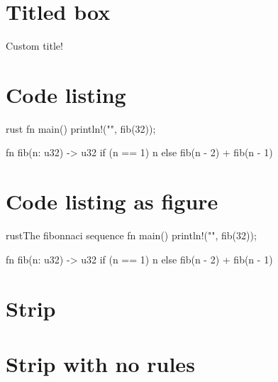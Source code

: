 \documentclass{scipaper}
\begin{document}
	\section{Titled box}
	\begin{titledbox}{Custom title!}
		\lipsum[1]
	\end{titledbox}
	\section{Code listing}
	\begin{codelisting}{rust}
		fn main() {
			println!("{}", fib(32));
		}
	
		fn fib(n: u32) -> u32 {
			if (n == 1) {
				n
			} else {
				fib(n - 2) + fib(n - 1)
			} 
		}
	\end{codelisting}
	\section{Code listing as figure}
	\begin{code}{rust}{The fibonnaci sequence}
		fn main() {
			println!("{}", fib(32));
		}
		
		fn fib(n: u32) -> u32 {
			if (n == 1) {
				n
			} else {
				fib(n - 2) + fib(n - 1)
			} 
		} 
	\end{code}
	\section{Strip}
	\lipsum[1-3]
	\begin{strip}
		\lipsum[3-6]
	\end{strip}
	\lipsum[7-10]
	\section{Strip with no rules}
	\lipsum[1-3]
	\begin{strip}[norule]
		\lipsum[3-6]
	\end{strip}
	\lipsum[7-10]
\end{document}
